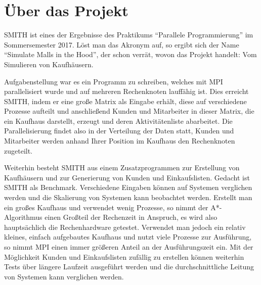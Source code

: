 \section{Über das Projekt}
SMITH ist eines der Ergebnisse des Praktikums \enquote{Parallele Programmierung} im Sommersemester 2017. Löst man das Akronym auf, so ergibt sich der Name \enquote{Simulate Malls in the Hood}, der schon verrät, wovon das Projekt handelt: Vom Simulieren von Kaufhäusern.

Aufgabenstellung war es ein Programm zu schreiben, welches mit MPI parallelisiert wurde und auf mehreren Rechenknoten lauffähig ist.
Dies erreicht SMITH, indem er eine große Matrix als Eingabe erhält, diese auf verschiedene Prozesse aufteilt und anschließend Kunden und Mitarbeiter in dieser Matrix, die ein Kaufhaus darstellt, erzeugt und deren Aktivitätenliste abarbeitet. Die Parallelisierung findet also in der Verteilung der Daten statt, Kunden und Mitarbeiter werden anhand Ihrer Position im Kaufhaus den Rechenknoten zugeteilt.

Weiterhin besteht SMITH aus einem Zusatzprogrammen zur Erstellung von Kaufhäusern und zur Generierung von Kunden und Einkaufslisten.
Gedacht ist SMITH als Benchmark. Verschiedene Eingaben können auf Systemen verglichen werden und die Skalierung von Systemen kann beobachtet werden. Erstellt man ein großes Kaufhaus und verwendet wenig Prozesse, so nimmt der A*-Algorithmus einen Großteil der Rechenzeit in Anspruch, es wird also hauptsächlich die Rechenhardware getestet. Verwendet man jedoch ein relativ kleines, einfach aufgebautes Kaufhaus und nutzt viele Prozesse zur Ausführung, so nimmt MPI einen immer größeren Anteil an der Ausführungszeit ein. Mit der Möglichkeit Kunden und Einkaufslisten zufällig zu erstellen können weiterhin Tests über längere Laufzeit ausgeführt werden und die durchschnittliche Leitung von Systemen kann verglichen werden.